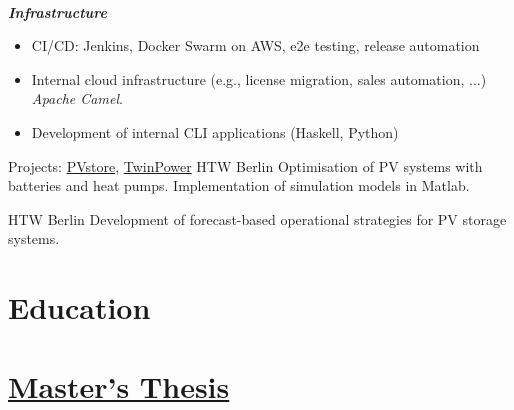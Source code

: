 \documentclass[11pt,a4paper,ngerman,sans]{moderncv}
\begin{document}
{\begin{itemize}
\begin{itemize}
          \\
      \end{itemize}
  \end{itemize}
  \textbf{\emph{Infrastructure}}
  \begin{itemize}
    \item CI/CD: Jenkins, Docker Swarm on AWS, e2e testing, release automation
    \item Internal cloud infrastructure (e.g., license migration, sales automation, ...)\newline
      \emph{Apache Camel}.	
    \item Development of internal CLI applications (Haskell, Python)
      \\
  \end{itemize}
}
{}


  {Projects:
    \href{https://pvspeicher.htw-berlin.de/forschungsprojekte/pv-store/}{PVstore},
    \href{https://pvspeicher.htw-berlin.de/forschungsprojekte/twinpower/}{TwinPower}
  }{HTW Berlin}{}
  {Optimisation of PV systems with batteries and heat pumps.\newline
  Implementation of simulation models in Matlab.
  }{}

{HTW Berlin}{}
{Development of forecast-based operational strategies for PV storage systems.}
{}

\clearpage
\section{Education}



\section{\href{https://pvspeicher.htw-berlin.de/wp-content/uploads/2017/11/Jakobi-2017-Development-of-model-based-control-applications-compliant-with-IEC-61499.pdf}{Master's Thesis}}
\end{document}
